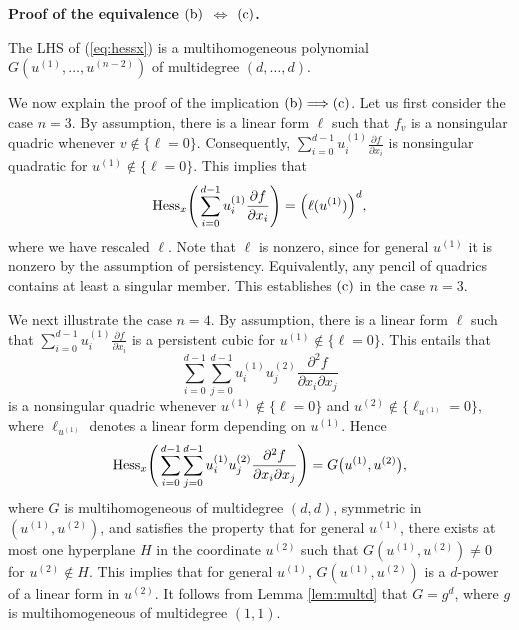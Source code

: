 \documentclass[aps,floatfix,groupedaddress,superscriptaddress,longbibliography,footinbib,notitlepage,showpacs]{revtex4-1}
\def\Hess{{\rm Hess}}
\begin{document}
{\bf Proof of the equivalence $(\textnormal{b})$ $\Longleftrightarrow$ $(\textnormal{c})$.}

The LHS of (\ref{eq:hessx}) is a multihomogeneous polynomial $G(u^{(1)},\ldots, u^{(n-2)})$ of multidegree $(d,\ldots, d)$.


We now explain the proof of the implication $(\textnormal{b}) \Longrightarrow (\textnormal{c})$. Let us first consider the case $n=3$. By assumption, there is a linear form $\ell$ such that $f_v$ is a nonsingular quadric whenever $v \notin \{\ell=0\}$. Consequently, $\sum_{i=0}^{d-1}u^{(1)}_i\frac{\partial f}{\partial x_i}$ is nonsingular quadratic for $u^{(1)} \notin \{\ell=0\}$. This implies that
\begin{equation}
\Hess_x\Bigg(\sum_{i=0}^{d-1}u^{(1)}_i\frac{\partial f}{\partial x_i}\Bigg)=\Big(\ell(u^{(1)})\Big)^d,
\end{equation}
where we have rescaled $\ell$. Note that $\ell$ is nonzero, since for general $u^{(1)}$ it is nonzero by the assumption of persistency. Equivalently, any pencil of quadrics contains at least a singular member. This establishes $(\textnormal{c})$ in the case $n=3$.

We next illustrate the case $n=4$. By assumption, there is a linear form $\ell$ such that $\sum_{i=0}^{d-1}u^{(1)}_i\frac{\partial f}{\partial x_i}$ is a persistent cubic for $u^{(1)}\notin \{\ell=0\}$. This entails that
\begin{equation}
\sum_{i=0}^{d-1} \sum_{j=0}^{d-1}u^{(1)}_i u^{(2)}_j\frac{\partial^2 f}{\partial x_i\partial x_j}
\end{equation}
is a nonsingular quadric whenever $u^{(1)}\notin \{\ell=0\}$ and $u^{(2)}\notin \{\ell_{u^{(1)}}=0\}$, where $\ell_{u^{(1)}}$ denotes a linear form depending on $u^{(1)}$. Hence
\begin{equation}
\Hess_x\Bigg(\sum_{i=0}^{d-1}
\sum_{j=0}^{d-1}u^{(1)}_iu^{(2)}_j\frac{\partial^2 f}{\partial x_i\partial x_j}\Bigg) = G\big(u^{(1)},u^{(2)}\big),
\end{equation}
where $G$ is multihomogeneous of multidegree $(d,d)$, symmetric in $(u^{(1)},u^{(2)})$, and satisfies the property that for general $u^{(1)}$, there exists at most one hyperplane $H$ in the coordinate $u^{(2)}$ such that $G(u^{(1)},u^{(2)})\neq 0$ for $u^{(2)}\notin H$. This implies that for general $u^{(1)}$, $G(u^{(1)},u^{(2)})$ is a $d$-power of a linear form in $u^{(2)}$. It follows from Lemma \ref{lem:multd} that $G=g^d$, where $g$ is multihomogeneous of multidegree $(1,1)$.
\end{document}
